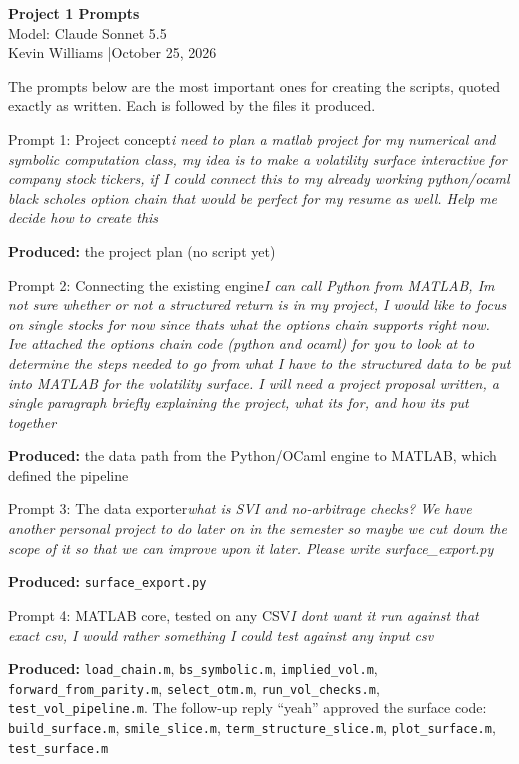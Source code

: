 \documentclass[11pt]{article}
\newcommand{\titleblock}[2]{\begin{center}{\LARGE\bfseries\color{accent}#1}\\[0.4em]{\large #2}\\[0.3em]{\small Kevin Williams \quad|\quad October 25, 2026}\end{center}\vspace{0.3em}}
\begin{document}
\titleblock{Project 1 Prompts}{Model: Claude Sonnet 5.5}

The prompts below are the most important ones for creating the scripts, quoted exactly as written. Each is followed by the files it produced.

\newcommand{\prompt}[3]{\begin{callout}{Prompt #1: #2}\textit{#3}\end{callout}}
\newcommand{\made}[1]{\par\vspace{-0.4em}\noindent\textbf{Produced:} #1\par\vspace{0.6em}}

\prompt{1}{Project concept}{i need to plan a matlab project for my numerical and symbolic computation class, my idea is to make a volatility surface interactive for company stock tickers, if I could connect this to my already working python/ocaml black scholes option chain that would be perfect for my resume as well. Help me decide how to create this}
\made{the project plan (no script yet)}

\prompt{2}{Connecting the existing engine}{I can call Python from MATLAB, Im not sure whether or not a structured return is in my project, I would like to focus on single stocks for now since thats what the options chain supports right now. Ive attached the options chain code (python and ocaml) for you to look at to determine the steps needed to go from what I have to the structured data to be put into MATLAB for the volatility surface. I will need a project proposal written, a single paragraph briefly explaining the project, what its for, and how its put together}
\made{the data path from the Python/OCaml engine to MATLAB, which defined the pipeline}

\prompt{3}{The data exporter}{what is SVI and no-arbitrage checks? We have another personal project to do later on in the semester so maybe we cut down the scope of it so that we can improve upon it later. Please write surface\_export.py}
\made{\texttt{surface\_export.py}}

\prompt{4}{MATLAB core, tested on any CSV}{I dont want it run against that exact csv, I would rather something I could test against any input csv}
\made{\texttt{load\_chain.m}, \texttt{bs\_symbolic.m}, \texttt{implied\_vol.m}, \texttt{forward\_from\_parity.m}, \texttt{select\_otm.m}, \texttt{run\_vol\_checks.m}, \texttt{test\_vol\_pipeline.m}. The follow-up reply ``yeah'' approved the surface code: \texttt{build\_surface.m}, \texttt{smile\_slice.m}, \texttt{term\_structure\_slice.m}, \texttt{plot\_surface.m}, \texttt{test\_surface.m}}
\end{document}
